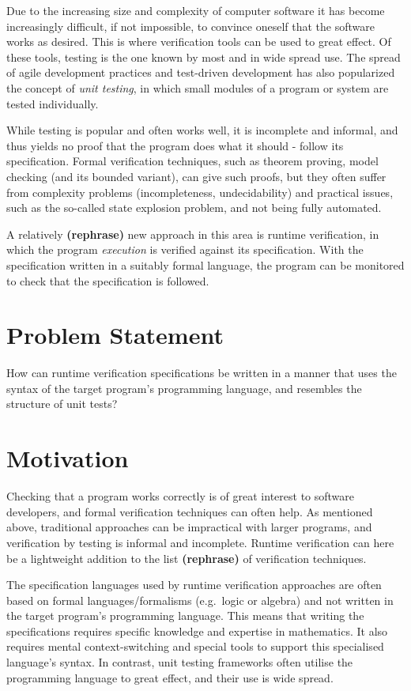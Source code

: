 \documentclass[a4paper,11pt]{kth-mag}
\newcommand{\rephrase}{\textbf{(rephrase)} }
\begin{document}
Due to the increasing size and complexity of computer software it has become
increasingly difficult, if not impossible, to convince oneself that the
software works as desired. This is where verification tools can be used to
great effect. Of these tools, testing is the one known by most and in wide
spread use.  The spread of agile development practices and test-driven
development has also popularized the concept of \textit{unit testing}, in which
small modules of a program or system are tested individually.

While testing is popular and often works well, it is incomplete and informal,
and thus yields no proof that the program does what it should - follow its
specification. Formal verification techniques, such as theorem proving, model
checking (and its bounded variant), can give such proofs, but they often suffer
from complexity problems (incompleteness, undecidability) and practical issues,
such as the so-called state explosion problem, and not being fully automated.

A relatively \rephrase new approach in this area is runtime verification, in
which the program \textit{execution} is verified against its specification.
With the specification written in a suitably formal language, the program can
be monitored to check that the specification is followed.


\section{Problem Statement}

How can runtime verification specifications be written in a manner that uses
the syntax of the target program's programming language, and resembles
the structure of unit tests?

\section{Motivation}

Checking that a program works correctly is of great interest to software
developers, and formal verification techniques can often help. As mentioned
above, traditional approaches can be impractical with larger programs, and
verification by testing is informal and incomplete. Runtime verification can
here be a lightweight addition to the list \rephrase of verification
techniques.

The specification languages used by runtime verification approaches are often
based on formal languages/formalisms (e.g.\ logic or algebra) and not written in
the target program's programming language.  This means that writing the
specifications requires specific knowledge and expertise in mathematics.  It
also requires mental context-switching and special tools to support this
specialised language's syntax. In contrast, unit testing frameworks often
utilise the programming language to great effect, and their use is wide spread.
\end{document}
